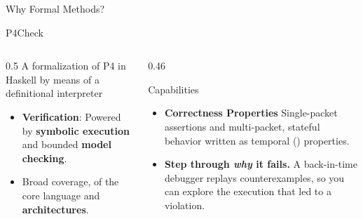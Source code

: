 \begin{frame}{Why Formal Methods?}
  \vspace{0.2em}

\end{frame}

\begin{frame}{P4Check}
  \begin{columns}[T,onlytextwidth]

    \begin{column}{0.5\textwidth}
      A formalization of P4 in Haskell by means of a definitional interpreter
        \begin{itemize}\setlength\itemsep{8pt}
        \item \textbf{Verification}: Powered by \textbf{symbolic execution} and bounded
              \textbf{model checking}.
        \item Broad \psix{} coverage, of the core language and
              \textbf{architectures}.
      \end{itemize}
    \end{column}

    \begin{column}{0.46\textwidth}
      \begin{block}{Capabilities}
        \small
        \begin{itemize}\setlength\itemsep{6pt}
          \item[\textcolor{palOlivine!60!black}{\checkmark}]
                \textbf{Correctness Properties} %
                Single-packet assertions and multi-packet, stateful behavior
                written as temporal (\LTL{}) properties.
          \item[\textcolor{palOlivine!60!black}{\checkmark}]
                \textbf{Step through \emph{why} it fails.}
                A back-in-time debugger replays counterexamples, so you can explore the
                execution that led to a violation.
        \end{itemize}
      \end{block}
    \end{column}

  \end{columns}
\end{frame}

